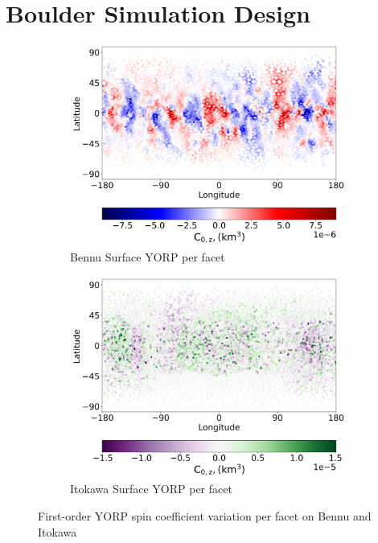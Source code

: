 \section{Boulder Simulation Design} \label{methods} %
\begin{figure}[t!]
    \begin{subfigure}{0.45\textwidth}
        \centering
        \includegraphics[width=\textwidth]{fig/bennu_base_facet_yorp.png}
        \caption{Bennu Surface YORP per facet}
    \end{subfigure}
    \hfill
    \begin{subfigure}{0.45\textwidth}
        \centering
        \includegraphics[width=\textwidth]{fig/itokawa_base_facet_yorp.png}
        \caption{Itokawa Surface YORP per facet}
    \end{subfigure}  
    \caption{First-order YORP spin coefficient variation per facet on Bennu and Itokawa}
    \label{fig:heatmaps}
\end{figure}
